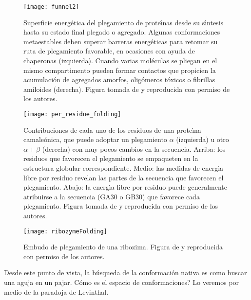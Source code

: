 \begin{figure}
\begin{center} 
\texttt{[image: funnel2]}
\caption%
{
Superficie energ\'{e}tica del plegamiento de prote\'\i{}nas desde su s\'\i{}ntesis hasta su estado final plegado o agregado. 
Algunas conformaciones metaestables deben superar barreras energ\'{e}ticas para retomar su ruta de plegamiento favorable,
en ocasiones con ayuda de chaperonas (izquierda). Cuando varias mol\'{e}culas se pliegan en el mismo compartimento pueden formar contactos
que propicien la acumulaci\'{o}n de agregados amorfos, olig\'{o}meros t\'{o}xicos o fibrillas amiloides (derecha).
Figura tomada de \citet{Amm2014} y reproducida con permiso de los autores.
}
\label{fig:foldfunnel}
\end{center}
\end{figure}

\begin{figure}
\begin{center} 
\texttt{[image: per\_residue\_folding]}
\caption%
{
Contribuciones de cada uno de los residuos de una prote\'\i{}na camale\'{o}nica, que puede adoptar 
un plegamiento $\alpha$ (izquierda) u otro $\alpha + \beta$ (derecha) con muy pocos cambios en la secuencia.
Arriba: los residuos que favorecen el plegamiento se empaqueten en la estructura globular correspondiente. 
Medio: las medidas de energ\'\i{}a libre por residuo revelan las partes de la secuencia que favorecen el plegamiento. 
Abajo: la energ\'\i{}a libre por residuo puede generalmente atribuirse a la secuencia (GA30 o GB30) que favorece cada plegamiento. 
Figura tomada de \citet{Roy2014} y reproducida con permiso de los autores.
}
\label{fig:per_residue_folding}
\end{center}
\end{figure}

\begin{figure}
\begin{center} 
\texttt{[image: ribozymeFolding]}
\caption%
{
Embudo de plegamiento de una ribozima.
Figura de \citet{Behrouzi2012} y reproducida con permiso de los autores.
}
\label{fig:foldfunnelRNA}
\end{center}
\end{figure}

Desde este punto de vista, la b\'{u}squeda de la conformaci\'{o}n nativa es como buscar una aguja en un pajar. 
C\'{o}mo es el espacio de conformaciones? Lo veremos por medio de la paradoja de Levinthal.

